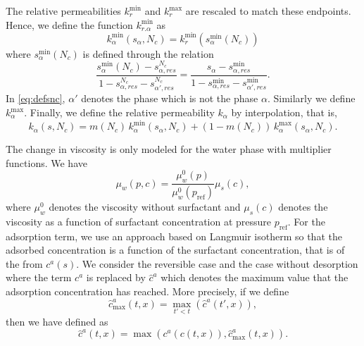\documentclass[11pt]{amsart}
\newcommand{\cads}{c^a}
\newcommand{\chatads}{\hat{c}^a}
\newcommand{\pref}{p_\text{ref}}
\begin{document}
The relative permeabilities $k_r^{\min}$ and $k_r^{\max}$ are rescaled to match these
endpoints. Hence, we define the function $k_{r.\alpha}^{\min}$ as
\begin{equation}
\label{eq:rescaledkr}
k_{\alpha}^{\min}(s_\alpha, N_c) = k_r^{\min}(s_\alpha^{\min}(N_c))
\end{equation}
where $s_\alpha^{\min}(N_c)$ is defined through the relation
\begin{equation}
  \label{eq:defsnc}
  \frac{s_\alpha^{\min}(N_c) - s_{\alpha,res}^{N_c}}{1 - s_{\alpha,res}^{N_c} - s_{\alpha',res}^{N_c}} =   \frac{s_\alpha - s_{\alpha,res}^{\min}}{1 - s_{\alpha,res}^{\min} - s_{\alpha',res}^{\min}}.
\end{equation}
In \eqref{eq:defsnc}, $\alpha'$ denotes the phase which is not the phase $\alpha$. Similarly we
define $k_{\alpha}^{\max}$. Finally, we define the relative permeability $k_{\alpha}$ by
interpolation, that is,
\begin{equation}
  \label{eq:defkralpha}
  k_{\alpha}(s, N_c) = m(N_c)\,k_{\alpha}^{\min}(s_\alpha, N_c) + (1 - m(N_c))\,k_{\alpha}^{\max}(s_\alpha, N_c).
\end{equation}

The change in viscosity is only modeled for the water phase with multiplier functions. We have
\begin{equation}
  \label{eq:defmuw}
  \mu_w(p, c) = \frac{\mu_w^0(p)}{\mu_w^0(\pref)}\mu_{s}(c),
\end{equation}
where $\mu_w^0$ denotes the viscosity without surfactant and $\mu_s(c)$ denotes the viscosity as a
function of surfactant concentration at pressure $\pref$. For the adsorption term, we use an
approach based on Langmuir isotherm so that the adsorbed concentration is a function of the
surfactant concentration, that is of the from $\cads(s)$. We consider the reversible case and the
case without desorption where the term $\cads$ is replaced by $\hat\cads$ which denotes the
maximum value that the adsorption concentration has reached. More precisely, if we define
\begin{equation}
  \label{eq:chatadsmax}
  \chatads_{\max}(t,x) = \max_{t'<t}(\chatads(t',x)),
\end{equation}
then we have
defined as
\begin{equation}
  \label{eq:defchatads}
  \chatads(t, x) = \max(\cads(c(t,x)), \chatads_{\max}(t,x)).
\end{equation}


\printbibliography
\end{document}
